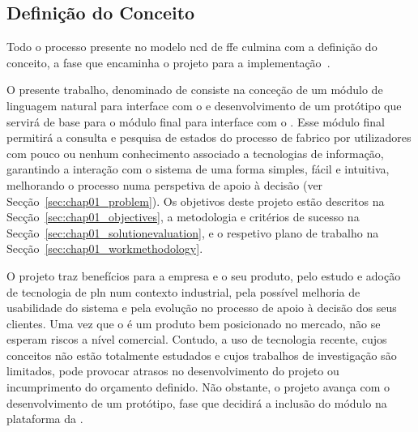 \subsection{Definição do Conceito}
Todo o processo presente no modelo \gls{ncd} de \gls{ffe} culmina com a definição do conceito, a fase que encaminha o projeto para a implementação~\parencite{ffe_effectivemethods_tools_techniques}.

O presente trabalho, denominado de  consiste na conceção de um módulo de linguagem natural para interface com o {\productname} e desenvolvimento de um protótipo que servirá de base para o módulo final para interface com o {\productname}. Esse módulo final permitirá a consulta e pesquisa de estados do processo de fabrico por utilizadores com pouco ou nenhum conhecimento associado a tecnologias de informação, garantindo a interação com o sistema de uma forma simples, fácil e intuitiva, melhorando o processo numa perspetiva de apoio à decisão (ver Secção~\ref{sec:chap01_problem}). Os objetivos deste projeto estão descritos na Secção~\ref{sec:chap01_objectives}, a metodologia e critérios de sucesso na Secção~\ref{sec:chap01_solutionevaluation}, e o respetivo plano de trabalho na Secção~\ref{sec:chap01_workmethodology}.

O projeto traz benefícios para a empresa e o seu produto, pelo estudo e adoção de tecnologia de \gls{pln} num contexto industrial, pela possível melhoria de usabilidade do sistema e pela evolução no processo de apoio à decisão dos seus clientes. Uma vez que o {\productname} é um produto bem posicionado no mercado, não se esperam riscos a nível comercial. Contudo, a uso de tecnologia recente, cujos conceitos não estão totalmente estudados e cujos trabalhos de investigação são limitados, pode provocar atrasos no desenvolvimento do projeto ou incumprimento do orçamento definido. Não obstante, o projeto avança com o desenvolvimento de um protótipo, fase que decidirá a inclusão do módulo na plataforma da {\companyname}.

